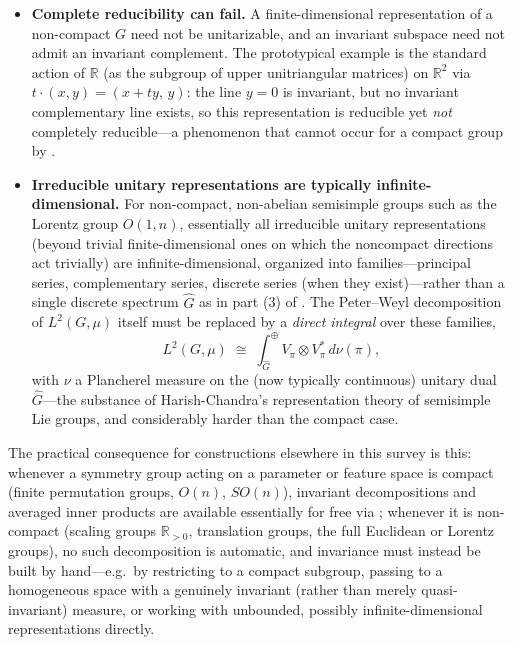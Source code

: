 \documentclass[mathematics,review,submit,moreauthors]{Definitions/mdpi}
\begin{document}
\begin{itemize}
    \item \textbf{Complete reducibility can fail.} A finite-dimensional
    representation of a non-compact $G$ need not be unitarizable, and an
    invariant subspace need not admit an invariant complement. The
    prototypical example is the standard action of $\mathbb{R}$ (as the
    subgroup of upper unitriangular matrices) on $\mathbb{R}^2$ via
    $t \cdot (x,y) = (x + ty,\, y)$: the line $y = 0$ is invariant, but no
    invariant complementary line exists, so this representation is
    reducible yet \emph{not} completely reducible---a phenomenon that
    cannot occur for a compact group by .
    \item \textbf{Irreducible unitary representations are typically
    infinite-dimensional.} For non-compact, non-abelian semisimple groups
    such as the Lorentz group $O(1,n)$, essentially all irreducible unitary
    representations (beyond trivial finite-dimensional ones on which the
    noncompact directions act trivially) are infinite-dimensional, organized
    into families---principal series, complementary series, discrete series
    (when they exist)---rather than a single discrete spectrum $\widehat{G}$
    as in part (3) of . The Peter--Weyl
    decomposition of $L^2(G,\mu)$ itself must be replaced by a
    \emph{direct integral} over these families,
    \[
        L^2(G,\mu) \;\cong\; \int_{\widehat{G}}^{\oplus} V_\pi \otimes V_\pi^* \, d\nu(\pi),
    \]
    with $\nu$ a Plancherel measure on the (now typically continuous)
    unitary dual $\widehat{G}$---the substance of Harish-Chandra's
    representation theory of semisimple Lie groups, and considerably harder
    than the compact case.
\end{itemize}

The practical consequence for constructions elsewhere in this survey is
this: whenever a symmetry group acting on a parameter or feature space is
compact (finite permutation groups, $O(n)$, $SO(n)$), invariant
decompositions and averaged inner products are available essentially for
free via ; whenever it is non-compact (scaling
groups $\mathbb{R}_{>0}$, translation groups, the full Euclidean or Lorentz
groups), no such decomposition is automatic, and invariance must instead be
built by hand---e.g.\ by restricting to a compact subgroup, passing to a
homogeneous space with a genuinely invariant (rather than merely
quasi-invariant) measure, or working with unbounded, possibly
infinite-dimensional representations directly.
\end{document}
